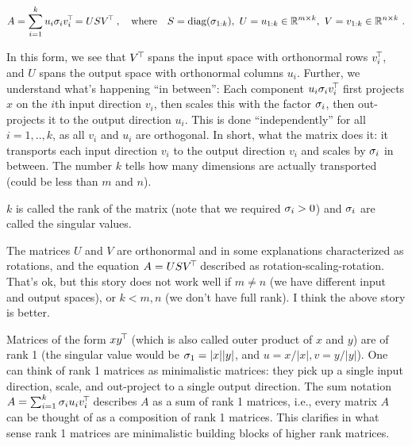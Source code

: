 \begin{align}
A = \sum_{i=1}^k  u_i \sigma_i v_i^{\!\top\!} = U S V^{\!\top\!}
~,\quad\text{where}\quad S = {\rm diag}(\sigma_{1:k}),~ U=u_{1:k}\in{\mathbb{R}}^{m\times k},~ V=
v_{1:k} \in {\mathbb{R}}^{n\times k} ~.
\end{align}

In this form, we see
that $V^{\!\top\!}$ spans the input space with orthonormal rows $v_i^{\!\top\!}$, and
$U$ spans the output space with orthonormal columns $u_i$. Further, we
understand what's happening ``in between'': 
Each component $u_i \sigma_i v_i^{\!\top\!}$ first projects $x$ on the $i$th input
direction $v_i$, then scales this with the factor $\sigma_i$, then
out-projects it to the output direction $u_i$. This is done
``independently'' for all $i=1,..,k$, as all $v_i$ and $u_i$ are
orthogonal. In short, what the matrix does it: it transports each
input direction $v_i$ to the output direction $v_i$ and scales by
$\sigma_i$ in between. The number $k$ tells how many dimensions are
actually transported (could be less than $m$ and $n$).

$k$ is called the rank of the matrix (note that we required $\sigma_i>0$)
and $\sigma_i$ are called the singular values.

The matrices $U$ and $V$ are orthonormal
and in some explanations characterized as rotations, and the equation
$A=U S V^{\!\top\!}$ described as rotation-scaling-rotation. That's ok, but
this story does not work well if $m\not= n$ (we have different input
and output spaces), or $k<m,n$ (we don't have full rank). I think the
above story is better.

Matrices of the form $x y^{\!\top\!}$ (which is also called outer product of
$x$ and $y$) are of rank 1 (the singular
value would be $\sigma_1 = |x||y|$, and $u=x/|x|, v=y/|y|$). One can think of rank 1 matrices as
minimalistic matrices: they pick up a single input direction, scale,
and out-project to a single output direction. The sum notation $A = \sum_{i=1}^k  \sigma_i u_i v_i^{\!\top\!}$ describes $A$ as
a sum of rank 1 matrices, i.e., every matrix $A$ can be thought of as a
composition of rank 1 matrices. This clarifies in what sense rank
1 matrices are minimalistic building blocks of higher
rank matrices.


